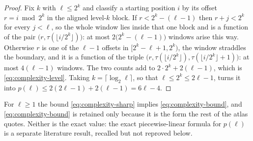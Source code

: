 \documentclass[11pt,oneside]{article}
\numberwithin{equation}{section}
\theoremstyle{definition}
\theoremstyle{remark}
\begin{document}
\begin{proof}
Fix \(k\) with \(\ell\le2^k\) and classify a starting position \(i\)
by its offset \(r=i\bmod2^k\) in the aligned level-\(k\) block.  If
\(r<2^k-(\ell-1)\) then \(r+j<2^k\) for every \(j<\ell\), so the whole
window lies inside that one block and is a function of the pair
\(\bigl(r,\tau(\lfloor i/2^k\rfloor)\bigr)\): at most
\(2\bigl(2^k-(\ell-1)\bigr)\) windows arise this way.  Otherwise \(r\)
is one of the \(\ell-1\) offsets in \([2^k-\ell+1,2^k)\), the window
straddles the boundary, and it is a function of the triple
\(\bigl(r,\tau(\lfloor i/2^k\rfloor),\tau(\lfloor
i/2^k\rfloor+1)\bigr)\): at most \(4(\ell-1)\) windows.  The two counts
add to \(2\cdot2^k+2(\ell-1)\), which is \eqref{eq:complexity-level}.
Taking \(k=\lceil\log_2\ell\rceil\), so that \(\ell\le2^k\le2\ell-1\),
turns it into \(p(\ell)\le2(2\ell-1)+2(\ell-1)=6\ell-4\).
\end{proof}

For \(\ell\ge1\) the bound \eqref{eq:complexity-sharp} implies
\eqref{eq:complexity-bound}, and \eqref{eq:complexity-bound} is
retained only because it is the form the rest of the atlas quotes.
Neither is the exact value: the exact piecewise-linear formula for
\(p(\ell)\) is a separate literature result, recalled but not
reproved below.
\end{document}
